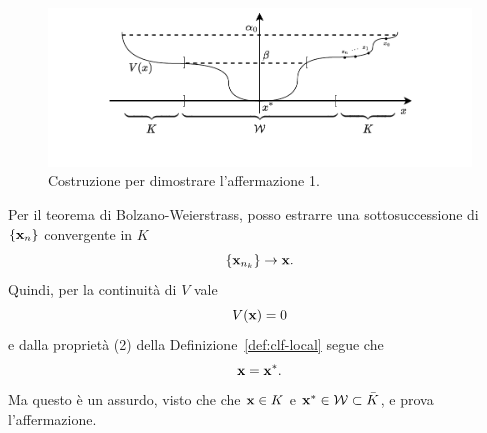 \begin{steps}
    \hfill
    \begin{minipage}{.8\textwidth}
        \begin{figure}[H]
            \centering
            \includegraphics[width=\textwidth,clip,trim=2.2cm 1cm 2.2cm 0]{assets/ljapunov-dim-aff1}
            \caption[Costruzione 1 per teorema di Ljapunov]{Costruzione per dimostrare
            l'affermazione 1.}
            \label{fig:ljapunov-dim-aff1}
        \end{figure}
    \end{minipage}

    Per il teorema di Bolzano-Weierstrass\footnotemark, posso estrarre una
    sottosuccessione di $\{\mathbf{x}_n\}$ convergente in $K$
    \begin{equation*}
    \{\mathbf{x}_ {n_k}\} \to \mathbf{x}.
    \end{equation*}
    Quindi, per la continuità di $V$ vale
    \begin{equation*}
        V(\mathbf{x}) = 0
    \end{equation*}
    e dalla proprietà (2) della Definizione~\ref{def:clf-local}
    segue che
    \begin{equation*}
        \mathbf{x} = \mathbf{x}^*.
    \end{equation*}
    Ma questo è un assurdo, visto che che $\mathbf{x} \in K$
    e $\mathbf{x}^* \in \mathcal W \subset \bar K$, e prova l'affermazione.

    \hfill\openbox\paragraph{}



\end{steps}

